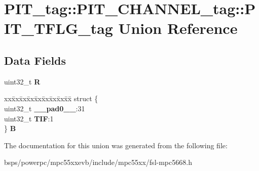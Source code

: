 \hypertarget{unionPIT__tag_1_1PIT__CHANNEL__tag_1_1PIT__TFLG__tag}{}\section{P\+I\+T\+\_\+tag\+::P\+I\+T\+\_\+\+C\+H\+A\+N\+N\+E\+L\+\_\+tag\+::P\+I\+T\+\_\+\+T\+F\+L\+G\+\_\+tag Union Reference}
\label{unionPIT__tag_1_1PIT__CHANNEL__tag_1_1PIT__TFLG__tag}
\subsection*{Data Fields}
\begin{DoxyCompactItemize}
\item 
\mbox{\label{unionPIT__tag_1_1PIT__CHANNEL__tag_1_1PIT__TFLG__tag_afb85b6bf2d09f4205ff8abb219f0bb7d}} 
uint32\+\_\+t {\bfseries R}
\item 
\mbox{\label{unionPIT__tag_1_1PIT__CHANNEL__tag_1_1PIT__TFLG__tag_a08708e46f1d812cf00ef4d71b321ed96}} 
\begin{tabbing}
xx\=xx\=xx\=xx\=xx\=xx\=xx\=xx\=xx\=\kill
struct \{\\
\>uint32\_t {\bfseries \_\_pad0\_\_}:31\\
\>uint32\_t {\bfseries TIF}:1\\
\} {\bfseries B}\\

\end{tabbing}\end{DoxyCompactItemize}


The documentation for this union was generated from the following file\+:\begin{DoxyCompactItemize}
\item 
bsps/powerpc/mpc55xxevb/include/mpc55xx/fsl-\/mpc5668.\+h\end{DoxyCompactItemize}
